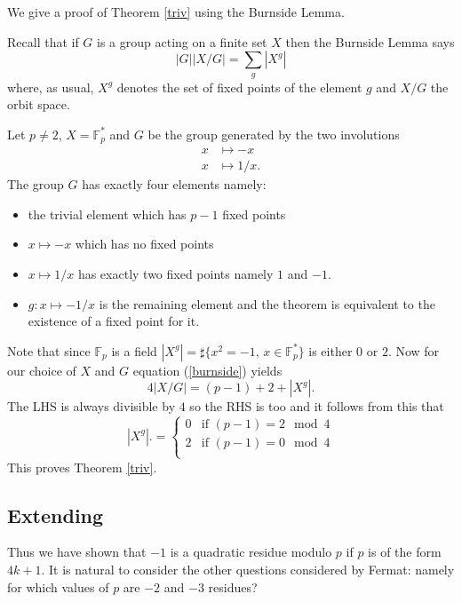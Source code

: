 \documentclass[12pt,a4paper]{amsart}
\def\fp{\mathbb{F}_p}
\begin{document}
We give a proof of Theorem \ref{triv} using the Burnside Lemma.


Recall that if $G$ is  a group acting on a finite set $X$ then the Burnside Lemma says
\begin{equation}\label{burnside}
|G| |X/G| = \sum_{g} |X^g| 
\end{equation}  
where, as usual, 
 $X^g$ denotes the set of fixed points of the element $g$ 
 and $X/G$  the orbit space.

Let $p\neq 2$,  $X = \fp^*$ and $G$ be the group generated by the two involutions
\begin{eqnarray*}
x & \mapsto -x \\
x & \mapsto 1/x.
\end{eqnarray*}
The group  $G$ has exactly four elements namely:
\begin{itemize}
\item the trivial element which has  $p-1$ fixed points
\item $x\mapsto -x$ which has no fixed points 
\item  $x\mapsto 1/x$ has exactly two fixed points namely $1$ and $-1$.
\item  $g:x \mapsto -1/x$ is the remaining element and the theorem is equivalent to the existence of a fixed point for it.
\end{itemize}
Note that since $\fp$ is a field 
$|X^g| = \sharp \{x^2 = -1, \, x\in \fp^* \}$
is either $0$ or $2$.
Now for our choice of $X$ and $G$ equation (\ref{burnside}) yields
\begin{equation}
4 |X/G|   = (p-1) + 2 + |X^g|.
\end{equation}  
The LHS is always divisible by $4$ so the  RHS is too and
it follows from this that
$$ |X^g|. = \left\{  \begin{array}{ll}
		0 & \text{if }(p-1) =  2 \mod 4 \\
2 & \text{if }(p-1) =  0 \mod 4 \\
\end{array}
\right.
$$
This proves Theorem \ref{triv}.

\subsection{Extending}

Thus we have shown that $-1$ is a quadratic residue modulo $p$ if
$p$ is of the form $4k+1$. 
It is natural to consider the other questions considered by Fermat:
namely for which values of $p$ are $-2$ and $-3$ residues?
\end{document}
